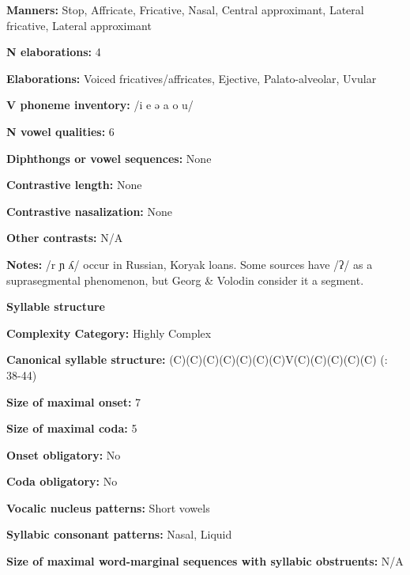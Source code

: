 \textbf{Manners:} Stop, Affricate, Fricative, Nasal, Central approximant, Lateral fricative, Lateral approximant



\textbf{N elaborations:} 4



\textbf{Elaborations:} Voiced fricatives/affricates, Ejective, Palato-alveolar, Uvular



\textbf{V phoneme inventory:} /i e ə a o u/



\textbf{N vowel qualities:} 6



\textbf{Diphthongs or vowel sequences:} None



\textbf{Contrastive length:} None



\textbf{Contrastive nasalization:} None



\textbf{Other contrasts:} N/A



\textbf{Notes:} /r ɲ ʎ/ occur in Russian, Koryak loans. Some sources have /ʔ/ as a suprasegmental phenomenon, but Georg \& Volodin consider it a segment. 



\textbf{Syllable structure}



\textbf{Complexity Category:} Highly Complex



\textbf{Canonical syllable structure:} (C)(C)(C)(C)(C)(C)(C)V(C)(C)(C)(C)(C) (\citealt{GeorgVolodin1999}: 38-44)



\textbf{Size of maximal onset:} 7



\textbf{Size of maximal coda:} 5



\textbf{Onset obligatory:} No



\textbf{Coda obligatory:} No



\textbf{Vocalic nucleus patterns:} Short vowels



\textbf{Syllabic consonant patterns:} Nasal, Liquid



\textbf{Size of maximal word{}-marginal sequences with syllabic obstruents:} N/A



